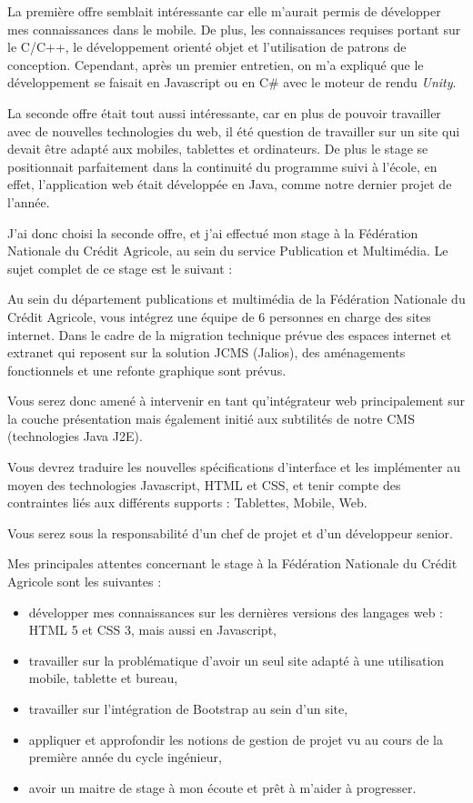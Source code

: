 \documentclass[12pt,a4paper]{article}
\begin{document}
\medskip
La première offre semblait intéressante car elle m'aurait permis de développer mes connaissances dans le mobile. De plus, les connaissances requises portant sur le C/C++, le développement orienté objet et l'utilisation de patrons de conception. Cependant, après un premier entretien, on m'a expliqué que le développement se faisait en Javascript ou en C\# avec le moteur de rendu \textit{Unity}.\par 
\medskip
La seconde offre était tout aussi intéressante, car en plus de pouvoir travailler avec de nouvelles technologies du web, il été question de travailler sur un site qui devait être adapté aux mobiles, tablettes et ordinateurs. De plus le stage se positionnait parfaitement dans la continuité du programme suivi à l'école, en effet, l'application web était développée en Java, comme notre dernier projet de l'année.\par 
\medskip
J'ai donc choisi la seconde offre, et j'ai effectué mon stage à la Fédération Nationale du Crédit Agricole, au sein du service Publication et Multimédia. Le sujet complet de ce stage est le suivant :\par 
\medskip
Au sein du département publications et multimédia de la Fédération Nationale du Crédit Agricole, vous intégrez une équipe de 6 personnes en charge des sites internet. Dans le cadre de la migration technique prévue des espaces internet et extranet qui reposent sur la solution JCMS (Jalios), des aménagements fonctionnels et une refonte graphique sont prévus.\par
Vous serez donc amené à intervenir en tant qu'intégrateur web principalement sur la couche présentation mais également initié aux subtilités de notre CMS (technologies Java J2E).\par
Vous devrez traduire les nouvelles spécifications d'interface et les implémenter au moyen des technologies Javascript, \gls{HTML} et \gls{CSS}, et tenir compte des contraintes liés aux différents supports : Tablettes, Mobile, Web.\par 
Vous serez sous la responsabilité d'un chef de projet et d'un développeur senior.\par 
\medskip
Mes principales attentes concernant le stage à la Fédération Nationale du Crédit Agricole sont les suivantes :
\begin{itemize}
\item développer mes connaissances sur les dernières versions des langages web : \gls{HTML} 5 et  \gls{CSS} 3, mais aussi en Javascript,
\item travailler sur la problématique d'avoir un seul site adapté à une utilisation mobile, tablette et bureau,
\item travailler sur l'intégration de Bootstrap au sein d'un site,
\item appliquer et approfondir les notions de gestion de projet vu au cours de la première année du cycle ingénieur,
\item avoir un maitre de stage à mon écoute et prêt à m'aider à progresser.
\end{itemize}\par 
\end{document}
